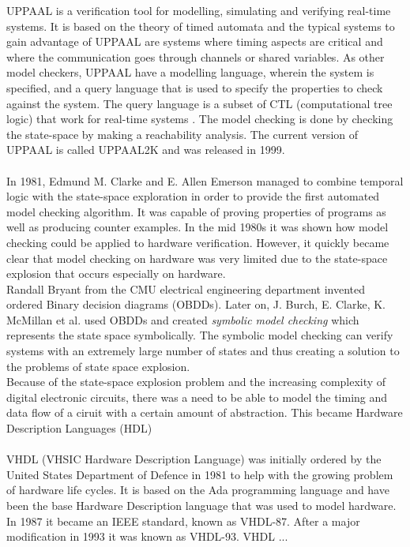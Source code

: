 \documentclass[a4paper]{report}
\begin{document}
UPPAAL is a verification tool for modelling, simulating and verifying real-time systems. It is based on the theory of timed automata\cite{Hopcroft2001}\cite{Alur1990} and the typical systems to gain advantage of UPPAAL are systems where timing aspects are critical and where the communication goes through channels or shared variables.
As other model checkers, UPPAAL have a modelling language, wherein the system is specified, and a query language that is used to specify the properties to check against the system. The query language is a subset of CTL (computational tree logic) that work for real-time systems\cite{Henzinger1994} \cite{Larsen1995}. The model checking is done by checking the state-space by making a reachability analysis. The current version of UPPAAL is called UPPAAL2K and was released in 1999\cite{Amnell2001}. \\\\
In 1981, Edmund M. Clarke and E. Allen Emerson managed to combine temporal logic with the state-space exploration in order to provide the first automated model checking algorithm\cite{Clarke1981}. It was capable of proving properties of programs as well as producing counter examples.
In the mid 1980s it was shown how model checking could be applied to hardware verification. However, it quickly became clear that model checking on hardware was very limited due to the state-space explosion that occurs especially on hardware. \\
Randall Bryant from the CMU electrical engineering department invented ordered Binary decision diagrams (OBDDs). Later on, J. Burch, E. Clarke, K. McMillan et al.\cite{Burch1992} used OBDDs and created \textit{symbolic model checking} which represents the state space symbolically. The symbolic model checking can verify systems with an extremely large number of states and thus creating a solution to the problems of state space explosion.\\
Because of the state-space explosion problem and the increasing complexity of digital electronic circuits, there was a need to be able to model the timing and data flow of a ciruit with a certain amount of abstraction. This became Hardware Description Languages (HDL) \\\\
VHDL (VHSIC Hardware Description Language) was initially ordered by the United States Department of Defence in 1981 to help with the growing problem of hardware life cycles. It is based on the Ada programming language and have been the base Hardware Description language that was used to model hardware. In 1987 it became an IEEE standard, known as VHDL-87. After a major modification in 1993 it was known as VHDL-93. VHDL ... 
\end{document}
